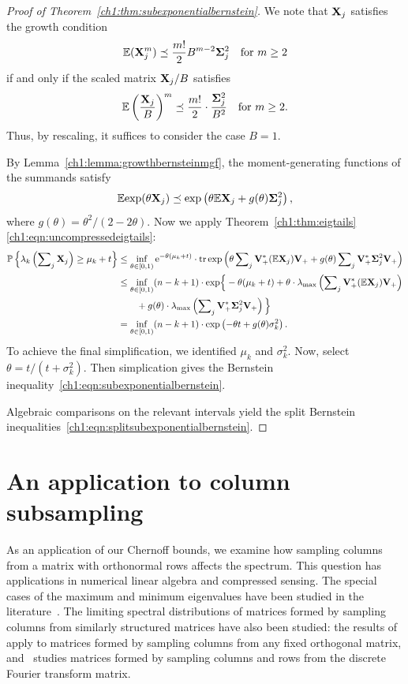 \begin{proof}[Proof of Theorem~\ref{ch1:thm:subexponentialbernstein}]

We note that $\mathbf{X}_j$ satisfies the growth condition
\[
 \mathbb{E} (\mathbf{X}_j^m) \preceq \frac{m!}{2} B^{m-2} \mathbf{\Sigma}_j^2 \quad \text{for
} m \geq 2 
\]
if and only if the scaled matrix $\mathbf{X}_j/B$ satisfies
\[
 \mathbb{E} \left(\frac{\mathbf{X}_j}{B}\right)^m \preceq \frac{m!}{2} \cdot
\frac{\mathbf{\Sigma}_j^2}{B^2} \quad \text{for } m \geq 2.
\]
Thus, by rescaling, it suffices to consider the case $B = 1.$

By Lemma~\ref{ch1:lemma:growthbernsteinmgf}, the moment-generating functions of the
summands satisfy  
\[
 \mathbb{E} \mathrm{exp}(\theta \mathbf{X}_j) \preceq \mathrm{exp}\left(\theta \mathbb{E} \mathbf{X}_j + g(\theta)
\mathbf{\Sigma}_j^2 \right),
\]
where $g(\theta) = \theta^2/(2 -2 \theta).$ Now we apply 
Theorem~\ref{ch1:thm:eigtails}\eqref{ch1:eqn:uncompressedeigtails}:
\begin{align*}
 \mathbb{P}\left\{\lambda_k\left(\sum\nolimits_j \mathbf{X}_j\right) \geq \mu_k + t\right\} & \leq
\inf_{\theta \in [0,1)} \mathrm{e}^{-\theta(\mu_k + t)} \cdot \operatorname{tr}\mathrm{exp}\left( \theta
\sum\nolimits_j \mathbf{V}_+^* (\mathbb{E}\mathbf{X}_j) \mathbf{V}_+ + g(\theta)
\sum\nolimits_j \mathbf{V}_+^* \mathbf{\Sigma}_j^2 \mathbf{V}_+ \right) \\
& \leq \inf_{\theta \in [0,1)} (n -k + 1)\cdot \mathrm{exp}\Big\{-\theta(\mu_k + t) +
\theta \cdot \lambda_{\mathrm{max}}\left(\sum\nolimits_j \mathbf{V}_+^* (\mathbb{E}\mathbf{X}_j) \mathbf{V}_+\right)
  \\
&  \qquad {} + g(\theta) \cdot \lambda_{\mathrm{max}}\left(\sum\nolimits_j \mathbf{V}_+^*
\mathbf{\Sigma}_j^2 \mathbf{V}_+\right) \Big\} \\
 & = \inf_{\theta \in [0, 1)} (n-k+1)\cdot \mathrm{exp}\left( -\theta t + g(\theta)
\sigma_k^2 \right).
\end{align*}
To achieve the final simplification, we identified $\mu_k$ and $\sigma_k^2.$
Now, select $\theta = t/(t + \sigma_k^2).$ Then simplication gives the Bernstein
inequality~\eqref{ch1:eqn:subexponentialbernstein}. 

Algebraic comparisons on the relevant intervals yield the split Bernstein
inequalities~\eqref{ch1:eqn:splitsubexponentialbernstein}.
\end{proof}

\section{An application to column subsampling}
\label{ch1:sec:colsubsampling}

As an application of our Chernoff bounds, we examine how sampling columns from a
matrix with orthonormal rows affects the spectrum. This question has
applications in numerical linear algebra and compressed sensing. The special
cases of the maximum and minimum eigenvalues have been studied in the 
literature~\cite{Tropp08, RV07}. The limiting spectral distributions of matrices formed by
sampling columns from similarly structured matrices have also been studied: the
results of~\cite{GH09} apply to matrices formed by sampling columns from any
fixed orthogonal matrix, and~\cite{F10} studies matrices formed by sampling
columns and rows from the discrete Fourier transform matrix. 

